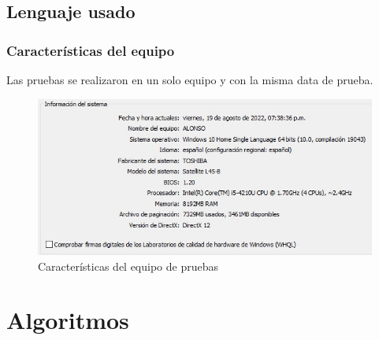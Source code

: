\documentclass[
	11pt, %
]{beamer}
\begin{document}

\subsection{Lenguaje usado}

\begin{frame}
	\frametitle{Características del equipo}
	
	Las pruebas se realizaron en un solo equipo y con la misma data de prueba.

		\begin{figure}
		\includegraphics[width=0.8\linewidth]{caracteristicas.png}
		\caption{Características del equipo de pruebas}
	   \end{figure}

\end{frame}

\section{Algoritmos}
\end{document}
